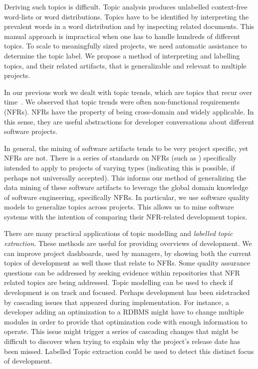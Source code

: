 \documentclass[]{sig-alternate}
\begin{document}
Deriving such topics is difficult. 
Topic analysis produces%
 unlabelled context-free word-lists or word distributions.
Topics have to be identified by interpreting the prevalent words in a word distribution and by inspecting related documents. 
This manual approach is impractical when one has to handle hundreds of different topics. To scale to meaningfully sized projects, we need automatic assistance to determine the topic label.
We propose a method of interpreting and labelling topics, and their related artifacts, that is generalizable and relevant to multiple projects.

In our previous work we dealt with topic trends, which are topics that recur over time~\cite{Hindle09ICSM}. 
We observed that topic trends were often non-functional requirements (NFRs). 
NFRs have the property of being cross-domain and widely applicable. 
In this sense, they are useful abstractions for developer conversations about different software projects.

In general, the mining of software artifacts tends to be very project specific, yet NFRs are not. There is a series of standards on NFRs (such as \cite{iso9126}) specifically intended to apply to projects of varying types (indicating this is possible, if perhaps not universally accepted).
This informs our method of generalizing the data mining of these software artifacts to leverage the global domain knowledge of software engineering, specifically NFRs. In particular, we use software quality models to generalize topics across projects. 
This allows us to mine software systems with the intention of comparing their NFR-related development topics.

There are many practical applications of topic modelling and \emph{labelled  topic extraction}.
These methods are useful for providing overviews of development.
We can improve project dashboards, used by managers, by showing both the current topics of development as well those that relate to NFRs.
Some quality assurance questions can be addressed by seeking evidence within repositories that NFR related topics are being addressed.
Topic modelling can be used to check if development is on track and focused.
Perhaps development has been sidetracked by cascading issues that appeared during implementation.
For instance, a developer adding an optimization to a RDBMS might have to change multiple modules in order to provide that optimization code with enough information to operate. 
This issue might trigger a series of cascading changes that might be difficult to discover when trying to explain why the project's release date has been missed. 
Labelled Topic extraction could be used to detect this distinct focus of development.
\end{document}
